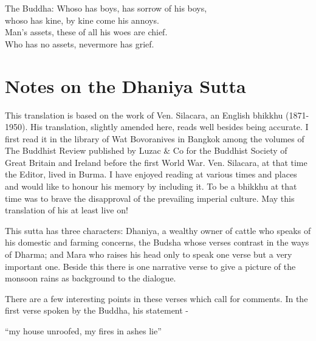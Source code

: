 \begin{MyDescription}{The Buddha:}  	
Whoso has boys, has sorrow of his boys,\\
whoso has kine, by kine come his annoys.\\
Man's assets, these of all his woes are chief.\\
Who has no assets, nevermore has grief.\\
\end{MyDescription}  
\begin{MyDescription}[(Sn. 18 - 34)]{}
\end{MyDescription}   
\newpage
\section{Notes on the Dhaniya Sutta}
   This translation is based on the work of Ven. Silacara, an English bhikkhu (1871-1950). His translation, slightly amended here, reads well besides being accurate. I first read it in the library of Wat Bovoranives in Bangkok among the volumes of The Buddhist Review published by Luzac \& Co for the Buddhist Society of Great Britain and Ireland before the first World War. Ven. Silacara, at that time the Editor, lived in Burma. I have enjoyed reading at various times and places and would like to honour his memory by including it. To be a bhikkhu at that time was to brave the disapproval of the prevailing imperial culture. May this translation of his at least live on!
   
   This sutta has three characters: Dhaniya, a wealthy owner of cattle who speaks of his domestic and farming concerns, the Budsha whose verses contrast in the ways of Dharma; and Mara who raises his head only to speak one verse but a very important one. Beside this there is one narrative verse to give a picture of the monsoon rains as background to the dialogue.
   
   There are a few interesting points in these verses which call for comments. In the first verse spoken by the Buddha, his statement - 
\begin{MyDescription}[]{}
   	“my house unroofed, my fires in ashes lie”
\end{MyDescription}   
   
